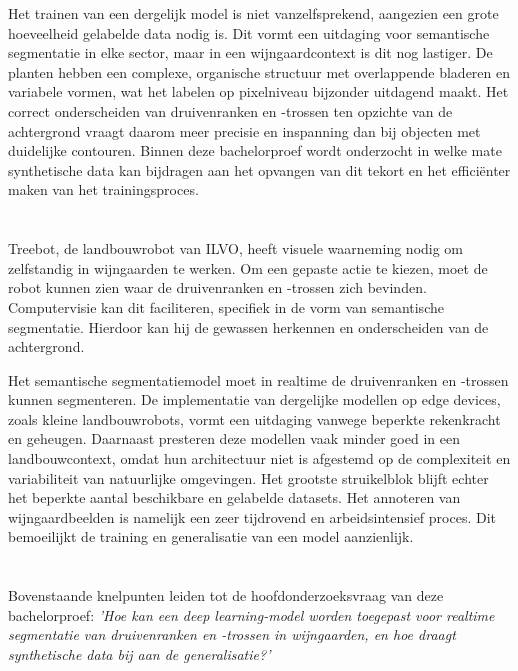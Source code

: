 Het trainen van een dergelijk model is niet vanzelfsprekend, aangezien een grote hoeveelheid gelabelde data nodig is. Dit vormt een uitdaging voor semantische segmentatie in elke sector, maar in een wijngaardcontext is dit nog lastiger. De planten hebben een complexe, organische structuur met overlappende bladeren en variabele vormen, wat het labelen op pixelniveau bijzonder uitdagend maakt. Het correct onderscheiden van druivenranken en -trossen ten opzichte van de achtergrond vraagt daarom meer precisie en inspanning dan bij objecten met duidelijke contouren. Binnen deze bachelorproef wordt onderzocht in welke mate synthetische data kan bijdragen aan het opvangen van dit tekort en het efficiënter maken van het trainingsproces.

\section{}%
\label{sec:probleemstelling}

Treebot, de landbouwrobot van ILVO, heeft visuele waarneming nodig om zelfstandig in wijngaarden te werken. Om een gepaste actie te kiezen, moet de robot kunnen zien waar de druivenranken en -trossen zich bevinden. Computervisie kan dit faciliteren, specifiek in de vorm van semantische segmentatie. Hierdoor kan hij de gewassen herkennen en onderscheiden van de achtergrond.

Het semantische segmentatiemodel moet in realtime de druivenranken en -trossen kunnen segmenteren. De implementatie van dergelijke modellen op edge devices, zoals kleine landbouwrobots, vormt een uitdaging vanwege beperkte rekenkracht en geheugen. Daarnaast presteren deze modellen vaak minder goed in een landbouwcontext, omdat hun architectuur niet is afgestemd op de complexiteit en variabiliteit van natuurlijke omgevingen. Het grootste struikelblok blijft echter het beperkte aantal beschikbare en gelabelde datasets. Het annoteren van wijngaardbeelden is namelijk een zeer tijdrovend en arbeidsintensief proces. Dit bemoeilijkt de training en generalisatie van een model aanzienlijk.

\section{}%
\label{sec:onderzoeksvraag}

Bovenstaande knelpunten leiden tot de hoofdonderzoeksvraag van deze bachelorproef: \emph{'Hoe kan een deep learning-model worden toegepast voor realtime segmentatie van druivenranken en -trossen in wijngaarden, en hoe draagt synthetische data bij aan de generalisatie?'} 


